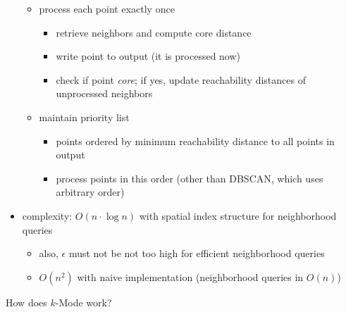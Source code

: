 \documentclass[12pt]{article}
\begin{document}
\begin{itemize}[left=0pt, nosep]
\begin{itemize}[left=0pt, nosep]
		\item process each point exactly once
		\begin{itemize}[left=0pt, nosep]
			\item retrieve neighbors and compute core distance
			\item write point to output (it is processed now)
			\item check if point \emph{core}; if yes, update reachability distances of unprocessed neighbors
		\end{itemize}
		\item maintain priority list
		\begin{itemize}[left=0pt, nosep]
			\item points ordered by minimum reachability distance to all points in output
			\item process points in this order (other than DBSCAN, which uses arbitrary order)
		\end{itemize}
	\end{itemize}
	\item complexity: $O(n \cdot \log n)$ with spatial index structure for neighborhood queries
	\begin{itemize}[left=0pt, nosep]
		\item also, $\epsilon$ must not be not too high for efficient neighborhood queries
		\item $O(n^2)$ with naive implementation (neighborhood queries in $O(n)$)
	\end{itemize}
\end{itemize}

\begin{question}
	How does $k$-Mode work?
\end{question}
\end{document}
